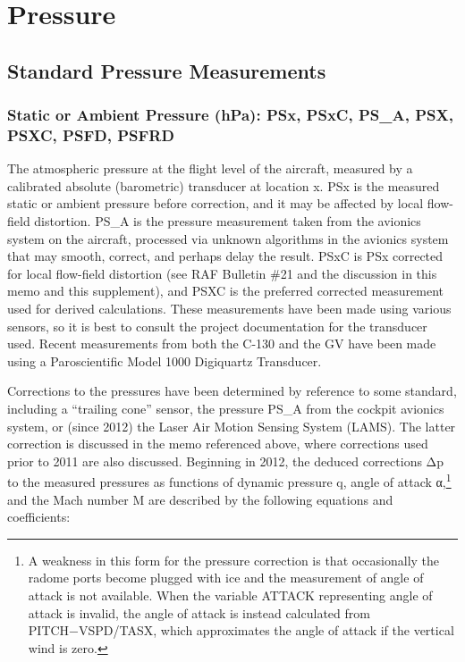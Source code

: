 \documentclass[
  english,
]{book}
\begin{document}
\hypertarget{pressure}{%
\section{Pressure}\label{pressure}}

\hypertarget{standard-pressure-measurements}{%
\subsection{Standard Pressure Measurements}\label{standard-pressure-measurements}}

\hypertarget{psx}{%
\subsubsection*{Static or Ambient Pressure (hPa): PSx, PSxC, PS\_A, PSX, PSXC, PSFD, PSFRD}\label{psx}}

The atmospheric pressure at the flight level of the aircraft, measured by a calibrated absolute (barometric) transducer at location x. PSx is the measured static or ambient pressure before correction, and it may be affected by local flow-field distortion. PS\_A is the pressure measurement taken from the avionics system on the aircraft, processed via unknown algorithms in the avionics system that may smooth, correct, and perhaps delay the result. PSxC is PSx corrected for local flow-field distortion (see RAF Bulletin \#21 and the discussion in this memo and this supplement), and PSXC is the preferred corrected measurement used for derived calculations. These measurements have been made using various sensors, so it is best to consult the project documentation for the transducer used. Recent measurements from both the C-130 and the GV have been made using a Paroscientific Model 1000 Digiquartz Transducer.

Corrections to the pressures have been determined by reference to some standard, including a ``trailing cone'' sensor, the pressure PS\_A from the cockpit avionics system, or (since 2012) the Laser Air Motion Sensing System (LAMS). The latter correction is discussed in the memo referenced above, where corrections used prior to 2011 are also discussed. Beginning in 2012, the deduced corrections {Δp} to the measured pressures as functions of dynamic pressure {q,} angle of attack {α,}\footnote{A weakness in this form for the pressure correction is that occasionally the radome ports become plugged with ice and the measurement of angle of attack is not available. When the variable ATTACK representing angle of attack is invalid, the angle of attack is instead calculated from PITCH{−}VSPD/TASX, which approximates the angle of attack if the vertical wind is zero.}
and the Mach number {M} are described by the following equations and coefficients:
\end{document}
